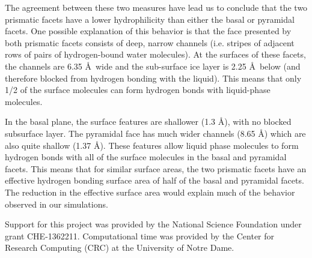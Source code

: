 \documentclass[aps,jcp,preprint,showpacs,superscriptaddress,groupedaddress]{revtex4}  %
\begin{document}
The agreement between these two measures have lead us to conclude that
the two prismatic facets have a lower hydrophilicity than either the
basal or pyramidal facets.  One possible explanation of this behavior
is that the face presented by both prismatic facets consists of deep,
narrow channels (i.e. stripes of adjacent rows of pairs of
hydrogen-bound water molecules).  At the surfaces of these facets,
the channels are 6.35 \AA\ wide and the sub-surface ice layer is 2.25
\AA\ below (and therefore blocked from hydrogen bonding with the
liquid).  This means that only 1/2 of the surface molecules can form
hydrogen bonds with liquid-phase molecules.

In the basal plane, the surface features are shallower (1.3 \AA), with
no blocked subsurface layer.  The pyramidal face has much wider
channels (8.65 \AA) which are also quite shallow (1.37 \AA).  These
features allow liquid phase molecules to form hydrogen bonds with all
of the surface molecules in the basal and pyramidal facets.  This
means that for similar surface areas, the two prismatic facets have an
effective hydrogen bonding surface area of half of the basal and
pyramidal facets.  The reduction in the effective surface area would
explain much of the behavior observed in our simulations.

\begin{acknowledgments}
  Support for this project was provided by the National
  Science Foundation under grant CHE-1362211. Computational time was
  provided by the Center for Research Computing (CRC) at the
  University of Notre Dame.
\end{acknowledgments}

\newpage


\end{document}
